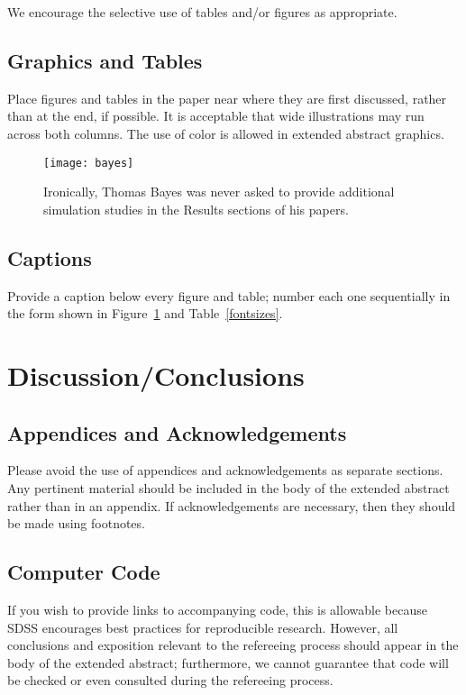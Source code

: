 \documentclass[10pt]{article}
\begin{document}
We encourage the selective use of tables and/or figures as appropriate.

\subsection{Graphics and Tables}

Place figures and tables in the
paper near where they are first discussed, rather than at the end, if
possible.  It is acceptable that wide illustrations
may run across both columns.  The use of color
is allowed in extended abstract graphics.

\begin{figure}[ht]
\begin{center}
\centerline{\texttt{[image: bayes]}}
\caption{Ironically, Thomas Bayes was never asked to provide additional
simulation studies in the Results sections of his papers.}
\label{bayespic}
\end{center}
\end{figure}

\subsection{Captions}
Provide a caption below every figure and table; number each one
sequentially in the form shown in Figure~\ref{bayespic} and
Table~\ref{fontsizes}.

\section{Discussion/Conclusions}

\subsection{Appendices and Acknowledgements}

Please avoid the use of appendices and acknowledgements
as separate sections.  Any pertinent material should be included in the
body of the extended abstract rather than in an appendix.  If
acknowledgements are necessary, then they should be made using footnotes.

\subsection{Computer Code}

If you wish to provide links to accompanying code, this is allowable because
SDSS encourages best practices for reproducible research.  However, all
conclusions and exposition relevant to the refereeing process should appear in
the body of the extended abstract; furthermore, we cannot guarantee that
code will be checked or even consulted during the refereeing process.
\end{document}
